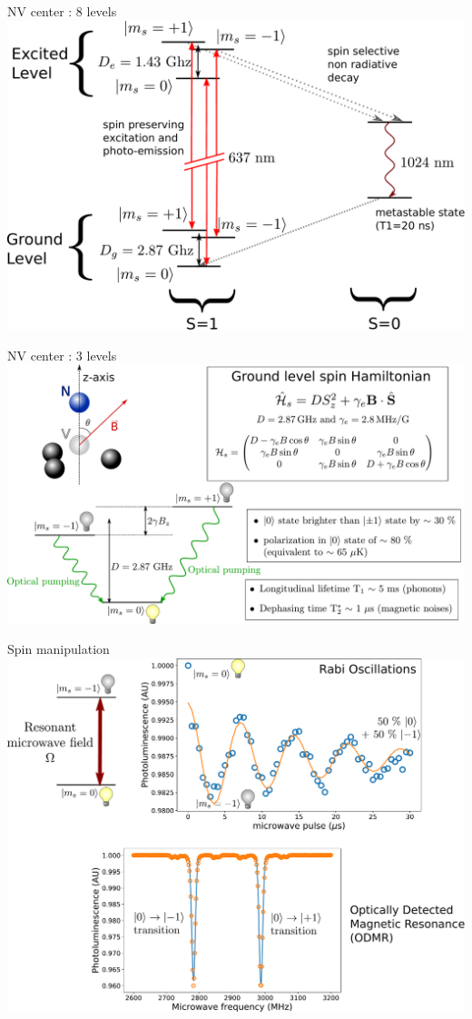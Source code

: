 \documentclass{beamer}
\begin{document}
\begin{frame}{NV center : 8 levels}
\centering
\includegraphics[scale=.3]{NV_8_niveaux}
\end{frame}
\begin{frame}{NV center : 3 levels}
\centering
\includegraphics[scale=.23]{slide_3_niveaux}
\end{frame}
\begin{frame}{Spin manipulation}
\centering
\includegraphics[scale=.25]{slide_rabi_odmr}
\end{frame}
\end{document}
